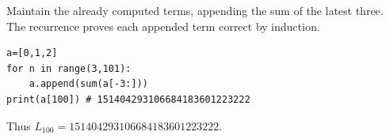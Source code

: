 Maintain the already computed terms, appending the sum of the latest three. The recurrence proves each appended term correct by induction.\begin{verbatim}
a=[0,1,2]
for n in range(3,101):
    a.append(sum(a[-3:]))
print(a[100]) # 151404293106684183601223222
\end{verbatim}
Thus $\boxed{L_{100}=151404293106684183601223222}$.
